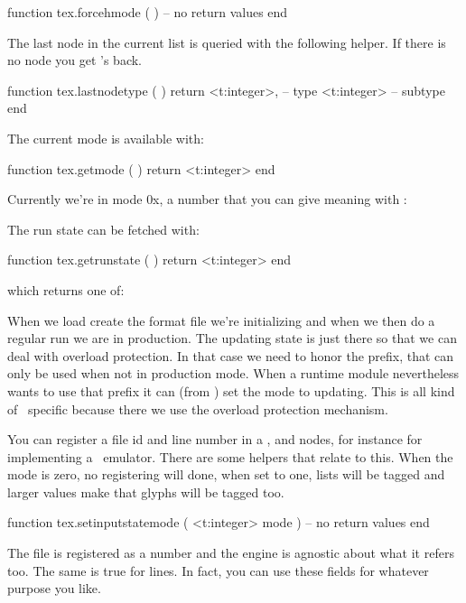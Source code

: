 \starttyping[option=LUA]
function tex.forcehmode ( )
    -- no return values
end
\stoptyping

The last node in the current list is queried with the following helper. If there is no
node you get 's back.

\starttyping[option=LUA]
function tex.lastnodetype ( )
    return
        <t:integer>, -- type
        <t:integer>  -- subtype
end
\stoptyping

The current mode is available with:

\starttyping[option=LUA]
function tex.getmode ( )
    return <t:integer>
end
\stoptyping

Currently we're in mode {\tttf 0x\tohexadecimal{}}, a
number that you can give meaning with :


The run state can be fetched with:

\starttyping[option=LUA]
function tex.getrunstate ( )
    return <t:integer>
end
\stoptyping

which returns one of:


When we load create the format file we're initializing and when we then do a
regular run we are in production. The updating state is just there so that we can
deal with overload protection. In that case we need to honor the \type
{\enforced} prefix, that can only be used when not in production mode. When a
runtime module nevertheless wants to use that prefix it can (from \LUA) set the
mode to updating. This is all kind of \CONTEXT\ specific because there we use
the overload protection mechanism.

\stopsubsection

\startsubsection[title=Files and lines]

You can register a file id and line number in a ,  and
 nodes, for instance for implementing a \SYNCTEX\ emulator. There are
some helpers that relate to this. When the mode is zero, no registering will
done, when set to one, lists will be tagged and larger values make that glyphs
will be tagged too.

\starttyping[option=LUA]
function tex.setinputstatemode ( <t:integer> mode )
    -- no return values
end
\stoptyping

The file is registered as a number and the engine is agnostic about what it
refers too. The same is true for lines. In fact, you can use these fields
for whatever purpose you like.

